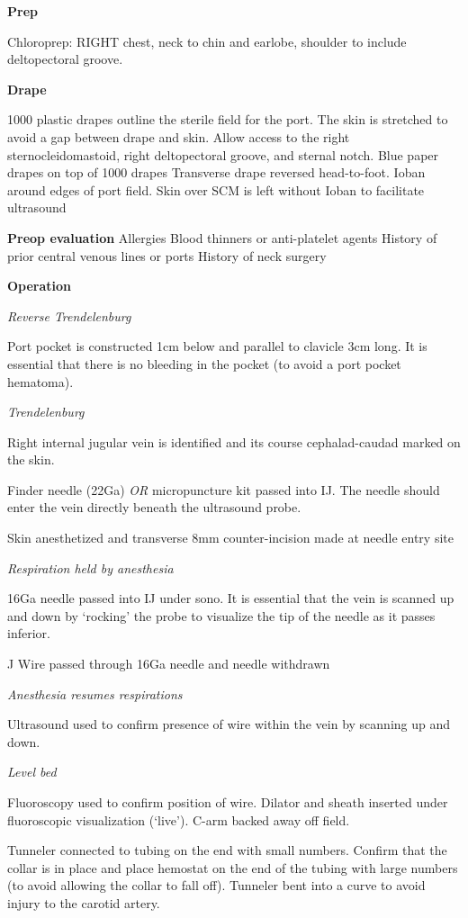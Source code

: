 \documentclass[
]{book}
\begin{document}
\textbf{Prep}

Chloroprep: RIGHT chest, neck to chin and earlobe, shoulder to include deltopectoral groove.

\textbf{Drape}

1000 plastic drapes outline the sterile field for the port. The skin is stretched to avoid a gap between drape and skin. Allow access to the right sternocleidomastoid, right deltopectoral groove, and sternal notch.
Blue paper drapes on top of 1000 drapes
Transverse drape reversed head-to-foot.
Ioban around edges of port field. Skin over SCM is left without Ioban to facilitate ultrasound

\textbf{Preop evaluation}
Allergies
Blood thinners or anti-platelet agents
History of prior central venous lines or ports
History of neck surgery

\textbf{Operation}

\emph{Reverse Trendelenburg}

Port pocket is constructed 1cm below and parallel to clavicle 3cm long. It is essential that there is no bleeding in the pocket (to avoid a port pocket hematoma).

\emph{Trendelenburg}

Right internal jugular vein is identified and its course cephalad-caudad marked on the skin.

Finder needle (22Ga) \emph{OR} micropuncture kit passed into IJ. The needle should enter the vein directly beneath the ultrasound probe.

Skin anesthetized and transverse 8mm counter-incision made at needle entry site

\emph{Respiration held by anesthesia}

16Ga needle passed into IJ under sono. It is essential that the vein is scanned up and down by `rocking' the probe to visualize the tip of the needle as it passes inferior.

J Wire passed through 16Ga needle and needle withdrawn

\emph{Anesthesia resumes respirations}

Ultrasound used to confirm presence of wire within the vein by scanning up and down.

\emph{Level bed}

Fluoroscopy used to confirm position of wire. Dilator and sheath inserted under fluoroscopic visualization (`live'). C-arm backed away off field.

Tunneler connected to tubing on the end with small numbers. Confirm that the collar is in place and place hemostat on the end of the tubing with large numbers (to avoid allowing the collar to fall off). Tunneler bent into a curve to avoid injury to the carotid artery.
\end{document}
